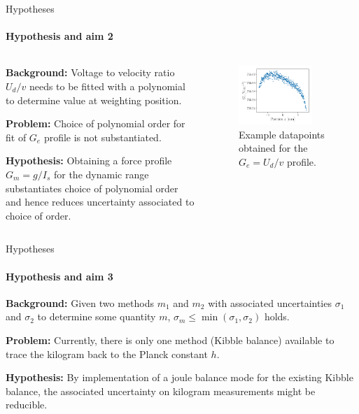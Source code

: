 \documentclass{beamer}
\begin{document}
\begin{frame}[allowframebreaks]{Hypotheses}
  \framesubtitle{Hypothesis and aim 2}

  \begin{columns}
    \begin{column}{0.59\textwidth}
\textbf{Background:} Voltage to velocity ratio $U_d/v$ needs to be fitted with a polynomial to determine value at weighting position.
    
    \textbf{Problem:} Choice of polynomial order for fit of $G_e$ profile is not substantiated.
    
    \textbf{Hypothesis:} Obtaining a force profile $G_m = g/I_s$ for the dynamic range substantiates choice of polynomial order and hence reduces uncertainty associated to choice of order.
    \end{column}
    
    \begin{column}{0.4\textwidth}
      \begin{figure}[h!] 
	\centering
	\includegraphics[width=0.8\textwidth]{figures/Ge_example.pdf}
	\caption{Example datapoints obtained for the $G_e = U_d/v$ profile.}
	\label{fig:U_d_over_v_profile}
      \end{figure}
    \end{column}
  \end{columns}
\end{frame}

\begin{frame}[allowframebreaks]{Hypotheses}
  \framesubtitle{Hypothesis and aim 3}

\textbf{Background:} Given two methods $m_1$ and $m_2$ with associated uncertainties $\sigma_1$ and $\sigma_2$ to determine some quantity $m$, $\sigma_m \leq \min(\sigma_1,\sigma_2)$ holds.

\textbf{Problem:} Currently, there is only one method (Kibble balance) available to trace the kilogram back to the Planck constant $h$.

\textbf{Hypothesis:} By implementation of a joule balance mode for the existing Kibble balance, the associated uncertainty on kilogram measurements might be reducible.
\end{frame}
\end{document}
